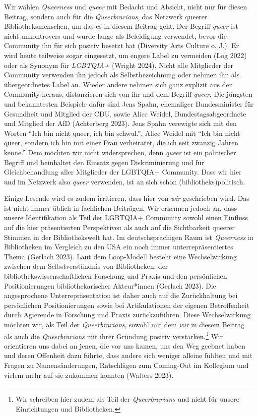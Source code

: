 \documentclass[a4paper,
fontsize=11pt,
oneside,
numbers=noperiodatend,
parskip=half-,
bibliography=totoc,
final
]{scrartcl}
\begin{document}
Wir wählen \emph{Queerness} und \emph{queer} mit Bedacht und Absicht,
nicht nur für diesen Beitrag, sondern auch für die \emph{Queerbrarians},
das Netzwerk queerer Bibliotheksmenschen, um das es in diesem Beitrag
geht. Der Begriff \emph{queer} ist nicht unkontrovers und wurde lange
als Beleidigung verwendet, bevor die Community ihn für sich positiv
besetzt hat (Diversity Arts Culture o. J.). Er wird heute teilweise
sogar eingesetzt, um engere Label zu vermeiden (Log 2022) oder als
Synonym für \emph{LGBTQIA+} (Wright 2024). Nicht alle Mitglieder der
Community verwenden ihn jedoch als Selbstbezeichnung oder nehmen ihn als
übergeordnetes Label an. Wieder andere nehmen sich ganz explizit aus der
Community heraus, distanzieren sich von ihr und dem Begriff
\emph{queer}. Die jüngsten und bekanntesten Beispiele dafür sind Jens
Spahn, ehemaliger Bundesminister für Gesundheit und Mitglied der CDU,
sowie Alice Weidel, Bundestagsabgeordnete und Mitglied der AfD
(Achterberg 2023). Jens Spahn verewigte sich mit den Worten \enquote{Ich
bin nicht queer, ich bin schwul.}, Alice Weidel mit \enquote{Ich bin
nicht queer, sondern ich bin mit einer Frau verheiratet, die ich seit
zwanzig Jahren kenne.} Dem möchten wir nicht widersprechen, denn
\emph{queer} ist ein politischer Begriff und beinhaltet den Einsatz
gegen Diskriminierung und für Gleichbehandlung aller Mitglieder der
LGBTQIA+ Community. Dass wir hier und im Netzwerk also \emph{queer}
verwenden, ist an sich schon (bibliotheks)politisch.

Einige Lesende wird es zudem irritieren, dass hier von \emph{wir}
geschrieben wird. Das ist nicht immer üblich in fachlichen Beiträgen.
Wir erkennen jedoch an, dass unsere Identifikation als Teil der LGBTQIA+
Community sowohl einen Einfluss auf die hier präsentierten Perspektiven
als auch auf die Sichtbarkeit queerer Stimmen in der Bibliothekswelt
hat. Im deutschsprachigen Raum ist \emph{Queerness} in Bibliotheken im
Vergleich zu den USA ein noch immer unterrepräsentiertes Thema (Gerlach
2023). Laut dem Loop-Modell besteht eine Wechselwirkung zwischen dem
Selbstverständnis von Bibliotheken, der bibliothekswissenschaftlichen
Forschung und Praxis und den persönlichen Positionierungen
bibliothekarischer Akteur*innen (Gerlach 2023). Die angesprochene
Unterrepräsentation ist daher auch auf die Zurückhaltung bei
persönlichen Positionierungen sowie bei Artikulationen der eigenen
Betroffenheit durch Agierende in Forschung und Praxis zurückzuführen.
Diese Wechselwirkung möchten wir, als Teil der \emph{Queerbrarians},
sowohl mit dem \emph{wir} in diesem Beitrag als auch die
\emph{Queerbrarians} mit ihrer Gründung positiv verstärken.\footnote{Wir
  schreiben hier zudem als Teil der \emph{Queerbrarians} und nicht für
  unsere Einrichtungen und Bibliotheken.} Wir orientieren uns dabei an
jenen, die vor uns kamen, uns den Weg geebnet haben und deren Offenheit
dazu führte, dass andere sich weniger alleine fühlten und mit Fragen zu
Namensänderungen, Ratschlägen zum Coming-Out im Kollegium und vielem
mehr auf sie zukommen konnten (Walters 2023).
\end{document}
